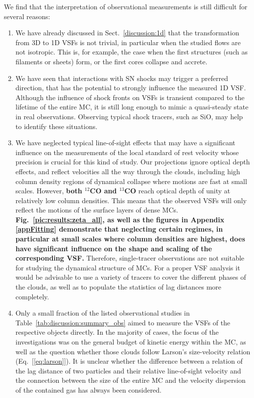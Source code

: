 We find that the interpretation of observational measurements is still difficult for several reasons:
\begin{enumerate}
\item We have already discussed in Sect.~\ref{discussion:1d} that the transformation from 3D to 1D VSFs is not trivial, in particular when the studied flows are not isotropic.
This is, for example, the case when the first structures (such as filaments or sheets) form, or the first cores collapse and accrete.
\item We have seen that interactions with SN shocks may trigger a preferred direction, that has the potential to strongly influence the measured 1D VSF.
Although the influence of shock fronts on VSFs is transient compared to the lifetime of the entire MC, it is still long enough to mimic a quasi-steady state in real observations.
Observing typical shock tracers, such as SiO, may help to identify these situations. 
\item We have neglected typical line-of-sight effects that may have a significant influence on the measurements of the local standard of rest velocity whose precision is crucial for this kind of study.
Our projections ignore optical depth effects, and reflect velocities all the way through the clouds, including high column density regions of dynamical collapse where motions are fast at small scales.
However, \textbf{both $^{12}$CO and $^{13}$CO} reach optical depth of unity at relatively low column densities. 
This means that the observed VSFs will only reflect the motions of the surface layers of dense MCs.  
\textbf{
    Fig.~\ref{pic:results:zeta_all}, as well as the figures in Appendix \ref{appFitting} demonstrate that neglecting certain regimes, in particular at small scales where column densities are highest, does have significant influence on the shape and scaling of the corresponding VSF.
}
Therefore, single-tracer observations are not suitable for studying the dynamical structure of MCs. 
For a proper VSF analysis it would be advisable to use a variety of tracers to cover the different phases of the clouds, as well as to populate the statistics of lag distances more completely.
\item Only a small fraction of the listed observational studies in Table~\ref{tab:discussion:summary_obs} aimed to measure the VSFs of the respective objects directly.
In the majority of cases, the focus of the investigations was on the general budget of kinetic energy within the MC, as well as the question whether those clouds follow Larson's size-velocity relation (Eq.~[\ref{eq:larson}]).
It is unclear whether the difference between a relation of the lag distance of two particles and their relative line-of-sight velocity and the connection between the size of the entire MC and the velocity dispersion of the contained gas has always been considered.
\end{enumerate}

